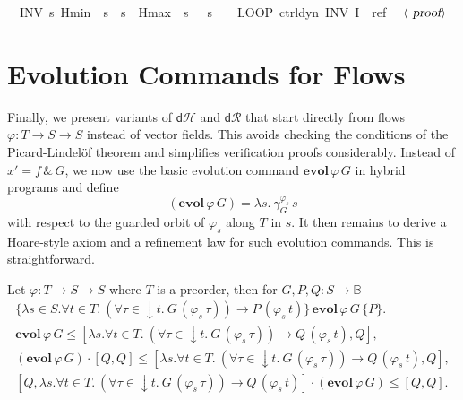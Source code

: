 \documentclass[envcountsame]{llncs}
\newcommand{\dH}{\mathsf{d}\mathcal{H}}
\newcommand{\dR}{\mathsf{d}\mathcal{R}}
\newcommand{\flow}{\varphi}
\newcommand{\bools}{\mathbb{B}}
\begin{document}
\begin{example}
\begin{isabellebody}
\ \ INV\ {\isacharparenleft}{\isasymlambda}s{\isachardot}\ Hmin\ {\isasymle}\ s{\isachardollar}{}\ {\isasymand}\ s{\isachardollar}{}\ {\isasymle}\ Hmax\ {\isasymand}\ {\isacharparenleft}s{\isachardollar}{}\ {\isacharequal}{}\ {\isasymor}\ s{\isachardollar}{}\ {\isacharequal}\ {}{\isacharparenright}{\isacharparenright}{\isacharparenright}{\isachardoublequoteclose}\ {\isacharparenleft}\ {\isachardoublequoteopen}LOOP\ {\isacharparenleft}{\isacharquery}ctrl{\isacharsemicolon}{\isacharquery}dyn{\isacharparenright}\ INV\ {\isacharquery}I\ {\isasymle}\ {\isacharquery}ref{\isachardoublequoteclose}{\isacharparenright}\isanewline
\ \ $\langle \isa{proof}\rangle$\isanewline
\end{isabellebody}
\end{example}


\section{Evolution Commands for Flows}\label{sec:from-flows}

Finally, we present variants of $\dH$ and $\dR$ that start directly
from flows $\flow:T\to S\to S$ instead of vector fields.  This avoids
checking the conditions of the Picard-Lindel\"of theorem and
simplifies verification proofs considerably.  Instead of
$x'=f\, \&\, G$, we now use the basic evolution command
$\mathbf{evol}\, \flow\, G$ in hybrid programs and define
\begin{equation*}
  (\mathbf{evol}\, \flow\, G) = \lambda s.\ \gamma^{\flow_s}_G\, s
\end{equation*}
with respect to the guarded orbit of $\flow_s$ along $T$ in $s$. It
then remains to derive a Hoare-style axiom and a refinement law
for such evolution commands. This is straightforward.
\begin{lemma}\label{P:hr-evlfl}
Let $\flow:T\to S\to S$ where $T$ is a preorder, then for $G,P,Q:S\to \bools$
\begin{gather*}
\{\lambda s\in S.\forall t\in T.\ (\forall
\tau\in {\downarrow}t.\ G\, (\flow_s\, \tau)) \rightarrow P\,
(\flow_s\, t)\}\, \mathbf{evol}\, \flow\, G\, \{P\}. \label{eq:h-evlfl}\tag{h-evlfl}\\
\mathbf{evol}\, \flow\, G \le [\lambda s.\forall t\in T.\ (\forall
\tau\in {\downarrow}t.\ G\, (\flow_s\, \tau))\to Q\, (\flow_s\, t),Q],\label{eq:r-evlf}\tag{r-evlf}\\
(\mathbf{evol}\, \flow\, G) \cdot \left[Q,Q\right] \le [\lambda s. \forall t\in T.\ (\forall
\tau\in {\downarrow}t.\ G\, (\flow_s\, \tau))\to Q\, (\flow_s\, t),Q],\label{eq:r-evlfl}\tag{r-evlfl}\\
\left[Q,\lambda s. \forall t\in T.\ (\forall
\tau\in {\downarrow}t.\ G\, (\flow_s\, \tau))\to Q\, (\flow_s\, t)\right]\cdot (\mathbf{evol}\, \flow\, G) \le [Q,Q].\label{eq:r-evlfr}\tag{r-evlfr}\\
\end{gather*}
\end{lemma}
\end{document}
